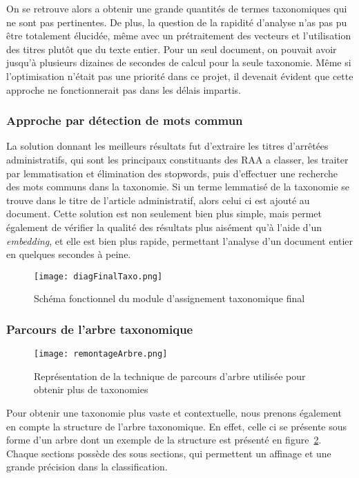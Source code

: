 On se retrouve alors a obtenir une grande quantités de termes taxonomiques qui ne sont pas pertinentes.
De plus, la question de la rapidité d'analyse n'as pas pu être totalement élucidée, même avec un prétraitement des vecteurs et l'utilisation des titres plutôt que du texte entier.
Pour un seul document, on pouvait avoir jusqu'à plusieurs dizaines de secondes de calcul pour la seule taxonomie.
Même si l'optimisation n'était pas une priorité dans ce projet, il devenait évident que cette approche ne fonctionnerait pas dans les délais impartis.


\subsubsection{Approche par détection de mots commun}
La solution donnant les meilleurs résultats fut d'extraire les titres d'arrêtées administratifs, qui sont les principaux constituants des RAA a classer, les traiter par lemmatisation et élimination des stopwords, puis d'effectuer une recherche des mots communs dans la taxonomie.
Si un terme lemmatisé de la taxonomie se trouve dans le titre de l'article administratif, alors celui ci est ajouté au document.
Cette solution est non seulement bien plus simple, mais permet également de vérifier la qualité des résultats plus aisément qu'à l'aide d'un \textit{embedding}, et elle est bien plus rapide, permettant l'analyse d'un document entier en quelques secondes à peine.

\begin{figure}[h!]
  \centering
  \texttt{[image: diagFinalTaxo.png]}
	\caption[]{Schéma fonctionnel du module d'assignement taxonomique final}
	\label{taxoFinal}
\end{figure}

\subsubsection{Parcours de l'arbre taxonomique}
\begin{figure}[h!]
  \centering
  \texttt{[image: remontageArbre.png]}
	\caption[]{Représentation de la technique de parcours d'arbre utilisée pour obtenir plus de taxonomies}
	\label{fig:tree}
\end{figure}


Pour obtenir une taxonomie plus vaste et contextuelle, nous prenons également en compte la structure de l'arbre taxonomique.
En effet, celle ci se présente sous forme d'un arbre dont un exemple de la structure est présenté en figure~\ref{fig:tree}. 
Chaque sections possède des sous sections, qui permettent un affinage et une grande précision dans la classification.

